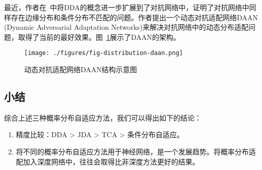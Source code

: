 \begin{figure*}[h]
	\centering
	
	\caption{动态分布自适应}
	\label{fig-distribution-dda}
\end{figure*}

最近，作者在~\cite{yu2019transfer}中将DDA的概念进一步扩展到了对抗网络中，证明了对抗网络中同样存在边缘分布和条件分布不匹配的问题。作者提出一个动态对抗适配网络DAAN (Dynamic Adversarial Adaptation Networks)来解决对抗网络中的动态分布适配问题，取得了当前的最好效果。图~\ref{fig-daan}展示了DAAN的架构。

\begin{figure}[htbp]
	\centering
	\texttt{[image: ./figures/fig-distribution-daan.png]}
	\caption{动态对抗适配网络DAAN结构示意图}
	\label{fig-daan}
\end{figure}

\subsection{小结}

综合上述三种概率分布自适应方法，我们可以得出如下的结论：

\begin{enumerate}
	\item 精度比较：DDA > JDA > TCA > 条件分布自适应。
	\item 将不同的概率分布自适应方法用于神经网络，是一个发展趋势。将概率分布适配加入深度网络中，往往会取得比非深度方法更好的结果。
\end{enumerate}

